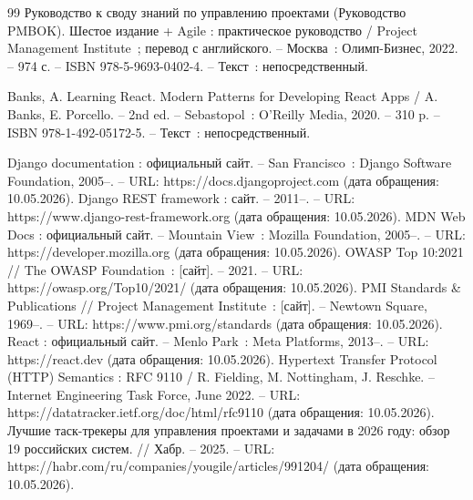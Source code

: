 \begin{thebibliography}{99}
	 Руководство к своду знаний по управлению проектами (Руководство PMBOK). Шестое издание + Agile : практическое руководство / Project Management Institute~; перевод с английского. -- Москва~: Олимп-Бизнес, 2022. -- 974 с. -- ISBN 978-5-9693-0402-4. -- Текст~: непосредственный.

	 Banks, A. Learning React. Modern Patterns for Developing React Apps / A. Banks, E. Porcello. -- 2nd ed. -- Sebastopol~: O'Reilly Media, 2020. -- 310 p. -- ISBN 978-1-492-05172-5. -- Текст~: непосредственный.

	 Django documentation : официальный сайт. -- San Francisco~: Django Software Foundation, 2005--. -- URL: https://docs.djangoproject.com (дата обращения: 10.05.2026).
	 Django REST framework : сайт. -- 2011--. -- URL: https://www.django-rest-framework.org (дата обращения: 10.05.2026).
	 MDN Web Docs : официальный сайт. -- Mountain View~: Mozilla Foundation, 2005--. -- URL: https://developer.mozilla.org (дата обращения: 10.05.2026).
	 OWASP Top 10:2021 // The OWASP Foundation~: [сайт]. -- 2021. -- URL: https://owasp.org/Top10/2021/ (дата обращения: 10.05.2026).
	 PMI Standards \& Publications // Project Management Institute~: [сайт]. -- Newtown Square, 1969--. -- URL: https://www.pmi.org/standards (дата обращения: 10.05.2026).
	 React : официальный сайт. -- Menlo Park~: Meta Platforms, 2013--. -- URL: https://react.dev (дата обращения: 10.05.2026).
	 Hypertext Transfer Protocol (HTTP) Semantics : RFC 9110 / R. Fielding, M. Nottingham, J. Reschke. -- Internet Engineering Task Force, June 2022. -- URL: https://datatracker.ietf.org/doc/html/rfc9110 (дата обращения: 10.05.2026).
	 Лучшие таск-трекеры для управления проектами и задачами в 2026 году: обзор 19 российских систем. // Хабр. -- 2025. -- URL: https://habr.com/ru/companies/yougile/articles/991204/ (дата обращения: 10.05.2026).

\end{thebibliography}

